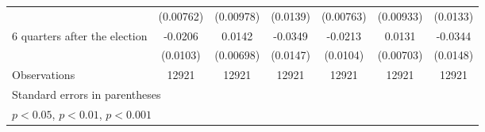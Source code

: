 \begin{table}[htbp]
\begin{tabular}{l*{6}{c}}
                    &   (0.00762)         &   (0.00978)         &    (0.0139)         &   (0.00763)         &   (0.00933)         &    (0.0133)         \\
[1em]
 6 quarters after the election&     -0.0206\sym{*}  &      0.0142\sym{*}  &     -0.0349\sym{*}  &     -0.0213\sym{*}  &      0.0131         &     -0.0344\sym{*}  \\
                    &    (0.0103)         &   (0.00698)         &    (0.0147)         &    (0.0104)         &   (0.00703)         &    (0.0148)         \\
\hline
Observations        &       12921         &       12921         &       12921         &       12921         &       12921         &       12921         \\
\hline\hline
\multicolumn{7}{l}{\footnotesize Standard errors in parentheses}\\
\multicolumn{7}{l}{\footnotesize \sym{*} \(p<0.05\), \sym{**} \(p<0.01\), \sym{***} \(p<0.001\)}\\
\end{tabular}
\end{table}
